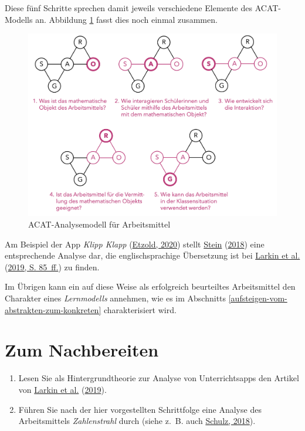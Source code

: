 \documentclass[
  ngerman,
]{scrbook}
\theoremstyle{definition}
\theoremstyle{definition}
\theoremstyle{definition}
\theoremstyle{definition}
\theoremstyle{remark}
\begin{document}
Diese fünf Schritte sprechen damit jeweils verschiedene Elemente des ACAT-Modells an. Abbildung \ref{fig:ACATAnalyse} fasst dies noch einmal zusammen.

\begin{figure}

{\centering \includegraphics[width=0.9\linewidth]{pictures/9-ACATAnalyse} 

}

\caption{ACAT-Analysemodell für Arbeitsmittel}\label{fig:ACATAnalyse}
\end{figure}

Am Beispiel der App \emph{Klipp Klapp} (\protect\hyperlink{ref-Etzold2020a}{Etzold, 2020}) stellt \protect\hyperlink{ref-Stein2018}{Stein} (\protect\hyperlink{ref-Stein2018}{2018}) eine entsprechende Analyse dar, die englischsprachige Übersetzung ist bei \protect\hyperlink{ref-Larkin2019}{Larkin et al.} (\protect\hyperlink{ref-Larkin2019}{2019, S. 85~ff.}) zu finden.

Im Übrigen kann ein auf diese Weise als erfolgreich beurteiltes Arbeitsmittel den Charakter eines \emph{Lernmodells} annehmen, wie es im Abschnitts \ref{aufsteigen-vom-abstrakten-zum-konkreten} charakterisiert wird.

\hypertarget{arbeitsmittel-analysieren-nachbereitung}{%
\section{Zum Nachbereiten}\label{arbeitsmittel-analysieren-nachbereitung}}

\begin{enumerate}
\def\labelenumi{\arabic{enumi}.}
\item
  Lesen Sie als Hintergrundtheorie zur Analyse von Unterrichtsapps den Artikel von \protect\hyperlink{ref-Larkin2019}{Larkin et al.} (\protect\hyperlink{ref-Larkin2019}{2019}).
\item
  Führen Sie nach der hier vorgestellten Schrittfolge eine Analyse des Arbeitsmittels \emph{Zahlenstrahl} durch (siehe z.~B. auch \protect\hyperlink{ref-Schulz2018}{Schulz, 2018}).
\end{enumerate}
\end{document}
